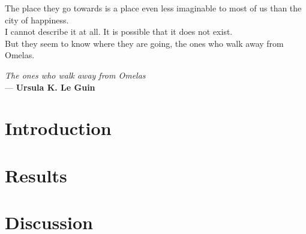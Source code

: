 



\frontmatter {}  %
    
    \epigraph{The place they go towards is a place even less imaginable to most of us than the city of happiness. \\ I cannot describe it at all. It is possible that it does not exist. \\ But they seem to know where they are going, the ones who walk away from Omelas.}{\textit{The ones who walk away from Omelas} \\ --- \textbf{Ursula K. Le Guin}}
    
    
    
     \tableofcontents {}

\mainmatter
    \part{Introduction}\label{introduction}
        
        
    \part{Results}\label{results}
        
        
        
    \part{Discussion}\label{discussion}
        
        

\backmatter
    \listoffigures
    
    
    



